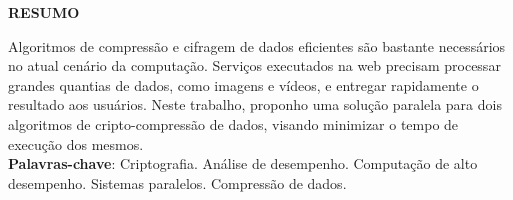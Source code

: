 
\begin{center}
        {\large\bfseries RESUMO}
\end{center}
    Algoritmos de compressão e cifragem de dados eficientes são bastante necessários no atual cenário da computação. Serviços executados na web precisam processar grandes quantias de dados, como imagens e vídeos, e entregar rapidamente o resultado aos usuários. Neste trabalho, proponho uma solução paralela para dois algoritmos de cripto-compressão de dados, visando minimizar o tempo de execução dos mesmos.\\
 \textbf{Palavras-chave}: Criptografia. Análise de desempenho. Computação de alto desempenho. Sistemas paralelos. Compressão de dados.
 


%
%
%
